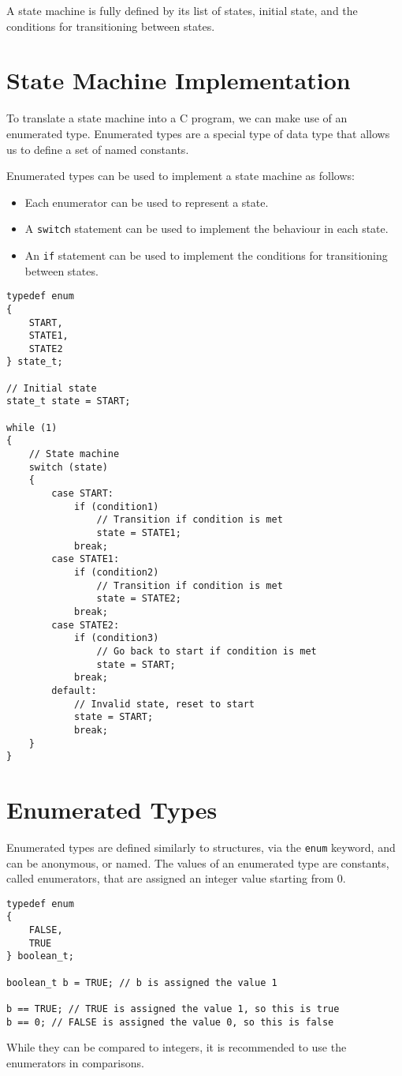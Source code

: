 \documentclass{report}
\begin{document}
A state machine is fully defined by its list of states, initial state,
and the conditions for transitioning between states.
\section{State Machine Implementation}
To translate a state machine into a C program, we can make use of an
enumerated type. Enumerated types are a special type of data type that
allows us to define a set of named constants.

Enumerated types can be used to implement a state machine as follows:
\begin{itemize}
    \item Each enumerator can be used to represent a state.
    \item A \texttt{switch} statement can be used to implement
          the behaviour in each state.
    \item An \texttt{if} statement can be used to implement the
          conditions for transitioning between states.
\end{itemize}
\begin{verbatim}
typedef enum
{
    START,
    STATE1,
    STATE2
} state_t;

// Initial state
state_t state = START;

while (1)
{
    // State machine
    switch (state)
    {
        case START:
            if (condition1)
                // Transition if condition is met
                state = STATE1;
            break;
        case STATE1:
            if (condition2)
                // Transition if condition is met
                state = STATE2;
            break;
        case STATE2:
            if (condition3)
                // Go back to start if condition is met
                state = START;
            break;
        default:
            // Invalid state, reset to start
            state = START;
            break;
    }
}
\end{verbatim}
\section{Enumerated Types}
Enumerated types are defined similarly to structures, via the
\texttt{enum} keyword, and can be anonymous, or named. The
values of an enumerated type are constants, called enumerators, that
are assigned an integer value starting from 0.
\begin{verbatim}
typedef enum
{
    FALSE,
    TRUE
} boolean_t;

boolean_t b = TRUE; // b is assigned the value 1

b == TRUE; // TRUE is assigned the value 1, so this is true
b == 0; // FALSE is assigned the value 0, so this is false
\end{verbatim}
While they can be compared to integers, it is recommended to use the
enumerators in comparisons.
\end{document}
